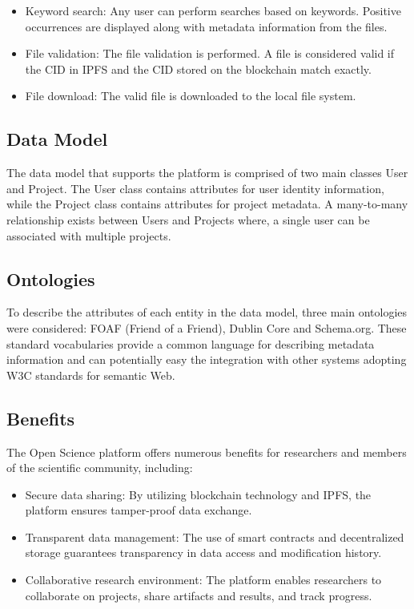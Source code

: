 \documentclass{article}
\begin{document}
\begin{itemize}
      \item Keyword search:
            \indent Any user can perform searches based on keywords. Positive occurrences are displayed along with metadata information from the files.

      \item File validation:
            \indent The file validation is performed. A file is considered valid if the CID in IPFS and the CID stored on the blockchain match exactly.

      \item File download:
            \indent The valid file is downloaded to the local file system.
\end{itemize}



\subsection{Data Model}

The data model that supports the platform is comprised of two main classes User and Project. The User class contains attributes for user identity information, while the Project class contains attributes for project metadata. A many-to-many relationship exists between Users and Projects where, a single user can be associated with multiple projects.

\subsection{Ontologies}

To describe the attributes of each entity in the data model, three main ontologies were considered: FOAF (Friend of a Friend), Dublin Core and Schema.org. These standard vocabularies provide a common language for describing metadata information and can potentially easy the integration with other systems adopting W3C standards for semantic Web.



\subsection{Benefits}

The Open Science platform offers numerous benefits for researchers and members of the scientific community, including:

\begin{itemize}
      \item Secure data sharing: By utilizing blockchain technology and IPFS, the platform ensures tamper-proof data exchange.
      \item Transparent data management: The use of smart contracts and decentralized storage guarantees transparency in data access and modification history.
      \item Collaborative research environment: The platform enables researchers to collaborate on projects, share artifacts and results, and track progress.
\end{itemize}
\end{document}
